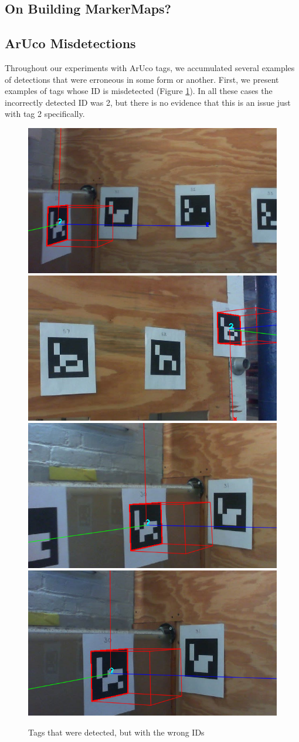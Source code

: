 \documentclass{article}
\begin{document}
	\subsection{On Building MarkerMaps?}

	\subsection{ArUco Misdetections}

    Throughout our experiments with ArUco tags, we accumulated several examples of detections that were erroneous in some form or another. First, we present examples of tags whose ID is misdetected (Figure \ref{fig:misdetected_tags}). In all these cases the incorrectly detected ID was 2, but there is no evidence that this is an issue just with tag 2 specifically.

    \begin{figure}[H]
      \centering
      \includegraphics[width=0.49\linewidth]{./images/misidentified_tag_1.png}
      \includegraphics[width=0.49\linewidth]{./images/misidentified_tag_2.png}
      \includegraphics[width=0.49\linewidth]{./images/misidentified_tag_3.png}
      \includegraphics[width=0.49\linewidth]{./images/misidentified_tag_4.png}
      \caption{Tags that were detected, but with the wrong IDs}
      \label{fig:misdetected_tags}
    \end{figure}
\end{document}
